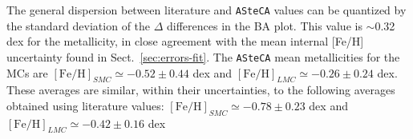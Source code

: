 \documentclass[draft]{aa}
\begin{document}
%
%

The general dispersion between literature and \texttt{ASteCA} values can be
quantized by the standard deviation of the $\Delta$ differences in the BA plot.
This value is $\sim$0.32 dex for the metallicity, in close agreement with the
mean internal [Fe/H] uncertainty found in Sect.~\ref{sec:errors-fit}.
The \texttt{ASteCA} mean metallicities for the MCs are
$\mathrm{[Fe/H]}_{SMC}{\simeq-}0.52{\pm}0.44$ dex and
$\mathrm{[Fe/H]}_{LMC}{\simeq-}0.26{\pm}0.24$ dex. These averages are similar,
within their uncertainties, to the following averages obtained using literature values:
$\mathrm{[Fe/H]}_{SMC}{\simeq-}0.78{\pm}0.23$ dex and
$\mathrm{[Fe/H]}_{LMC}{\simeq-}0.42{\pm}0.16$ dex\\
\end{document}
